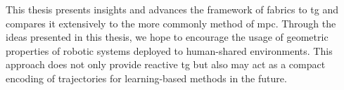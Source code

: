 This thesis presents insights and advances the framework of \ac{fabrics} to
\ac{tg} and compares it extensively to the more commonly method of \ac{mpc}.
Through the ideas presented in this thesis, we hope to encourage the
usage of geometric properties of robotic systems deployed to human-shared 
environments. This approach does not only provide reactive \ac{tg} but also may
act as a compact encoding of trajectories for learning-based methods in the
future.










